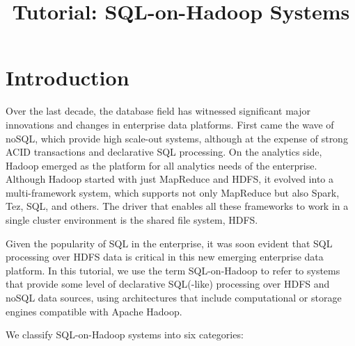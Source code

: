 \documentclass{vldb}
\begin{document}
\title{Tutorial: SQL-on-Hadoop Systems}


\author{
}

\maketitle




\section{Introduction}

Over the last decade, the database field has witnessed significant major innovations and changes in enterprise data platforms. First came the wave of noSQL, which provide high scale-out systems, although at the expense of strong ACID transactions and declarative SQL processing. On the analytics side, Hadoop emerged as the platform for all analytics needs of the enterprise. Although Hadoop started with just MapReduce and HDFS, it evolved into a multi-framework system, which supports not only MapReduce but also Spark, Tez, SQL, and others. The driver that enables all these frameworks to work in a single cluster environment is the shared file system, HDFS. 

Given the popularity of SQL in the enterprise, it was soon evident that SQL processing over HDFS data is critical in this new emerging enterprise data platform. In this tutorial, we use the term SQL-on-Hadoop to refer to systems that provide some level of declarative SQL(-like) processing over HDFS and noSQL data sources, using architectures that include computational or storage engines compatible with Apache Hadoop.

We classify SQL-on-Hadoop systems into six categories:
\end{document}

